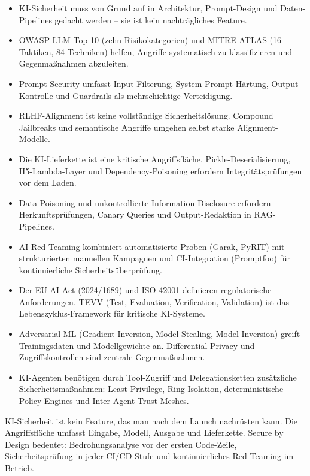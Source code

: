 \begin{zusammenfassung}
\begin{itemize}[leftmargin=*]
    \item KI-Sicherheit muss von Grund auf in Architektur, Prompt-Design und Daten-Pipelines gedacht werden -- sie ist kein nachträgliches Feature.
    \item OWASP LLM Top 10 (zehn Risikokategorien) und MITRE ATLAS (16 Taktiken, 84 Techniken) helfen, Angriffe systematisch zu klassifizieren und Gegenmaßnahmen abzuleiten.
    \item Prompt Security umfasst Input-Filterung, System-Prompt-Härtung, Output-Kontrolle und Guardrails als mehrschichtige Verteidigung.
    \item RLHF-Alignment ist keine vollständige Sicherheitslösung. Compound Jailbreaks und semantische Angriffe umgehen selbst starke Alignment-Modelle.
    \item Die KI-Lieferkette ist eine kritische Angriffsfläche. Pickle-Deserialisierung, H5-Lambda-Layer und Dependency-Poisoning erfordern Integritätsprüfungen vor dem Laden.
    \item Data Poisoning und unkontrollierte Information Disclosure erfordern Herkunftsprüfungen, Canary Queries und Output-Redaktion in RAG-Pipelines.
    \item AI Red Teaming kombiniert automatisierte Proben (Garak, PyRIT) mit strukturierten manuellen Kampagnen und CI-Integration (Promptfoo) für kontinuierliche Sicherheitsüberprüfung.
    \item Der EU AI Act (2024/1689) und ISO 42001 definieren regulatorische Anforderungen. TEVV (Test, Evaluation, Verification, Validation) ist das Lebenszyklus-Framework für kritische KI-Systeme.
    \item Adversarial ML (Gradient Inversion, Model Stealing, Model Inversion) greift Trainingsdaten und Modellgewichte an. Differential Privacy und Zugriffskontrollen sind zentrale Gegenmaßnahmen.
    \item KI-Agenten benötigen durch Tool-Zugriff und Delegationsketten zusätzliche Sicherheitsmaßnahmen: Least Privilege, Ring-Isolation, deterministische Policy-Engines und Inter-Agent-Trust-Meshes.
\end{itemize}
\end{zusammenfassung}

\begin{merke}
KI-Sicherheit ist kein Feature, das man nach dem Launch nachrüsten kann. Die Angriffsfläche umfasst Eingabe, Modell, Ausgabe und Lieferkette. Secure by Design bedeutet: Bedrohungsanalyse vor der ersten Code-Zeile, Sicherheitsprüfung in jeder CI/CD-Stufe und kontinuierliches Red Teaming im Betrieb.
\end{merke}

